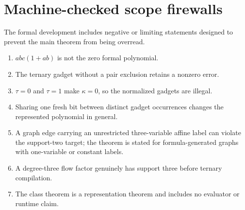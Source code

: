 \section{Machine-checked scope firewalls}\label{app:firewalls}

The formal development includes negative or limiting statements designed to prevent the
main theorem from being overread.

\begin{enumerate}[leftmargin=1.8em]
\item \(abc(1+ab)\) is not the zero formal polynomial.
\item The ternary gadget without a pair exclusion retains a nonzero error.
\item \(\tau=0\) and \(\tau=1\) make \(\kappa=0\), so the normalized gadgets are illegal.
\item Sharing one fresh bit between distinct gadget occurrences changes the represented
polynomial in general.
\item A graph edge carrying an unrestricted three-variable affine label can violate the
support-two target; the theorem is stated for formula-generated graphs with one-variable
or constant labels.
\item A degree-three flow factor genuinely has support three before ternary compilation.
\item The class theorem is a representation theorem and includes no evaluator or runtime
claim.
\end{enumerate}

